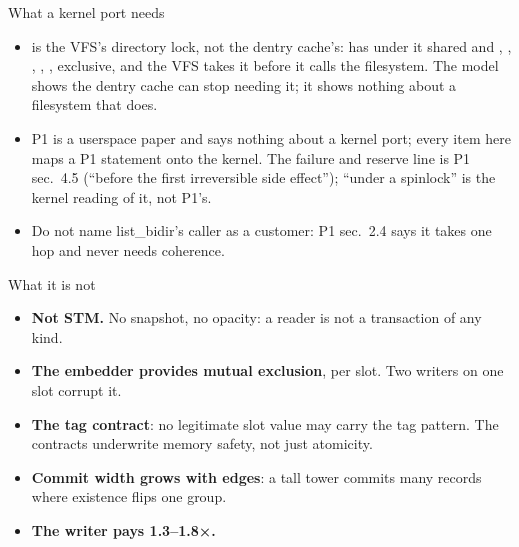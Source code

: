 \documentclass[aspectratio=169, 10pt, t, xcolor=table]{beamer}
\begin{document}
\begin{frame}{What a kernel port needs}
{\begin{itemize}
      directory and a cached child each hold one. Whether a count is the
      right tool for that, or whether this is a use for hazard pointers, is
      not evaluated.
\item {} is the VFS's directory lock, not the dentry cache's:
       has  under it
      shared and , , , ,
      ,  exclusive, and the VFS takes it before it
      calls the filesystem. The model shows the dentry cache can stop needing
      it; it shows nothing about a filesystem that does.
\item P1 is a userspace paper and says nothing about a kernel port; every item
      here maps a P1 statement onto the kernel. The failure and reserve line
      is P1 sec.\ 4.5 (``before the first irreversible side effect''); ``under
      a spinlock'' is the kernel reading of it, not P1's.
\item Do not name list\_bidir's caller as a customer: P1 sec.\ 2.4 says it
      takes one hop and never needs coherence.
\end{itemize}}
\end{frame}

\begin{frame}{What it is not}
\begin{itemize}
\item \textbf{Not STM.} No snapshot, no opacity: a reader is not a transaction
      of any kind.
\item \textbf{The embedder provides mutual exclusion}, per slot.
      Two writers on one slot corrupt it.
\item \textbf{The tag contract}: no legitimate slot value may carry the tag
      pattern. The contracts underwrite memory safety, not just atomicity.
\item \textbf{Commit width grows with edges}: a tall tower commits many
      records where existence flips one group.
\item \textbf{The writer pays 1.3--1.8×.}
\end{itemize}
\end{frame}
\end{document}
